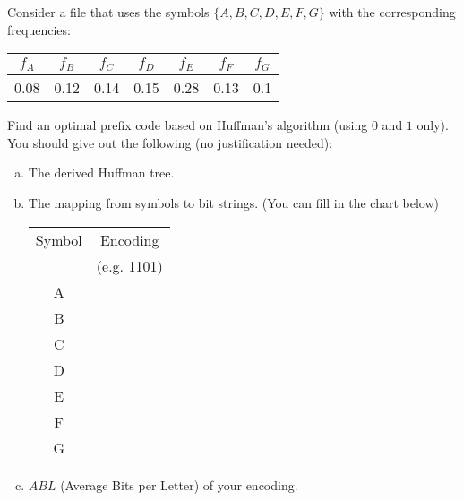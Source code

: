 \documentclass[11pt]{article}
\begin{document}
    
    \begin{tcolorbox}[title={Problem 3 (Huffman Encoding Practice, 15 points)}] \setlength\parindent{1em}
        Consider a file that uses the symbols $\{A,B,C,D,E,F,G\}$ with the corresponding frequencies:
        
        \begin{center}
            \begin{tabular}{c|c|c|c|c|c|c}
               $f_A$  & $f_B$ & $f_C$ & $f_D$ & $f_E$ & $f_F$ & $f_G$ \\
               \hline
                0.08 & 0.12 & 0.14 & 0.15 & 0.28 & 0.13 & 0.1 \\
            \end{tabular}
        \end{center}

        Find an optimal prefix code based on Huffman’s algorithm (using $0$ and $1$ only). You should give out the following (no justification needed):
        
        \begin{enumerate}[(a)]
        \item The derived Huffman tree.
        \item The mapping from symbols to bit strings. (You can fill in the chart below)
        \begin{center}
            \begin{tabular}{c|c}
               Symbol & Encoding \\ 
               & (e.g. 1101)\\ \hline
                A & \\ \hline
                B & \\ \hline
                C & \\ \hline
                D & \\ \hline
                E & \\ \hline
                F & \\ \hline
                G & \\            
            \end{tabular}
        \end{center}
        \item $ABL$ (Average Bits per Letter) of your encoding.
        \end{enumerate}    
    \end{tcolorbox}

    \newpage
\end{document}
